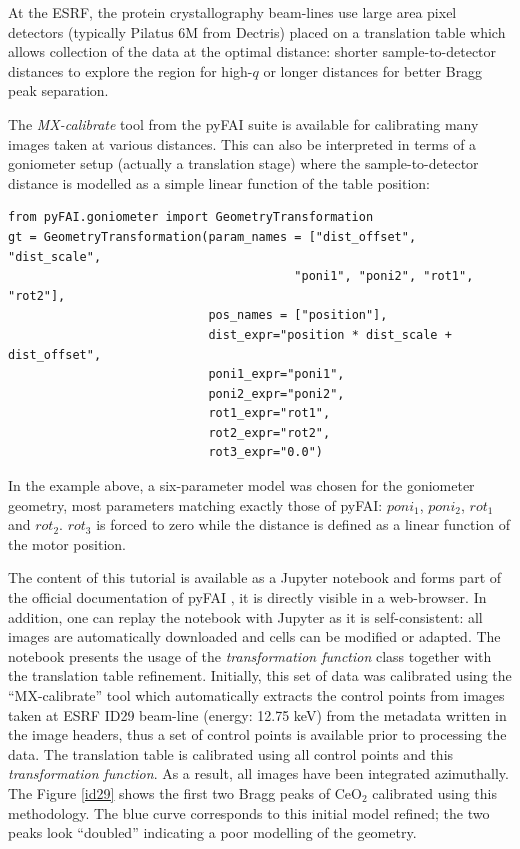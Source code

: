 \documentclass[preprint]{iucr}              %
\begin{document}
At the  ESRF, the protein crystallography beam-lines use large area pixel detectors
(typically Pilatus 6M from Dectris) placed on a translation table which allows
collection of the data at the optimal distance: shorter sample-to-detector
distances to explore the region for high-$q$ 
or longer distances for better Bragg peak separation. 

The \textit{MX-calibrate} tool from the pyFAI suite is available for
calibrating many images taken at various distances.
This can also be interpreted in terms of a goniometer setup (actually a translation stage) 
where the sample-to-detector distance is modelled as a
simple linear function of the table position:

\begin{verbatim}
from pyFAI.goniometer import GeometryTransformation
gt = GeometryTransformation(param_names = ["dist_offset", "dist_scale", 
                                        "poni1", "poni2", "rot1", "rot2"],
                            pos_names = ["position"],
                            dist_expr="position * dist_scale + dist_offset", 
                            poni1_expr="poni1",
                            poni2_expr="poni2", 
                            rot1_expr="rot1", 
                            rot2_expr="rot2", 
                            rot3_expr="0.0")
\end{verbatim}
 
In the example above, a six-parameter model was chosen for the goniometer
geometry, most parameters matching exactly those of pyFAI: 
$poni_1$, $poni_2$, $rot_1$
and $rot_2$. 
$rot_3$ is forced to zero while the distance is defined as a 
linear function of the motor position. 

The content of this tutorial is available as a Jupyter
notebook \cite{ipython} and forms part of the official documentation of pyFAI
\cite{translation_table}, it is directly visible in a web-browser. 
In addition, one can replay the notebook with Jupyter as it is self-consistent: 
all images are automatically downloaded and cells can be
modified or adapted.
The notebook presents the usage of the \textit{transformation function} class
together with the translation table refinement.
Initially, this set of data was calibrated using the ``MX-calibrate'' tool
which automatically extracts the control points from images taken at
ESRF ID29 beam-line (energy: 12.75 keV) from
the metadata written in the image headers, thus a set of control points is
available prior to processing the data. 
The translation table is calibrated using all control points
and this \textit{transformation function}.
As a result, all images have been integrated azimuthally.
The Figure \ref{id29} shows the first two Bragg peaks of CeO$_2$ calibrated
using this methodology. 
The blue curve corresponds to this initial model refined; the two peaks look
``doubled'' indicating a poor modelling of the geometry.
\end{document}
